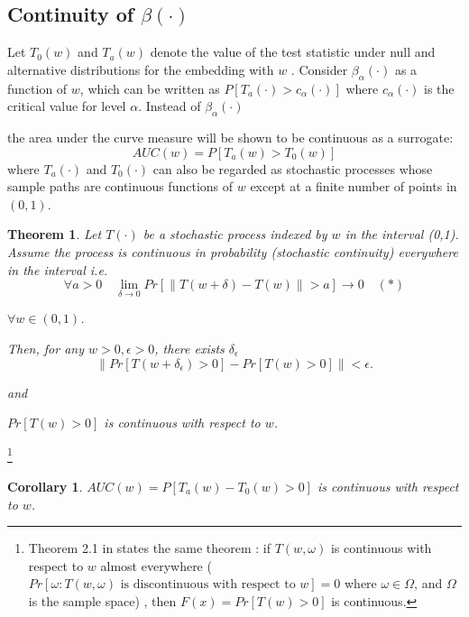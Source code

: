 \documentclass[11pt]{article} %
\newtheorem{thm}{Theorem}
\newtheorem{cor}{Corollary}
\begin{document}
 
\subsection{Continuity of $\beta(\cdot)$} 
 Let $T_0(w)$ and $T_a(w)$ denote the value of the test statistic under null and alternative distributions  for the embedding with $w$ .  %
Consider $\beta_{\alpha}(\cdot)$ as a function of $w$, which can be written as $P\left[T_a(\cdot)>c_{\alpha}(\cdot)\right]$ where $c_{\alpha}(\cdot)$ is the critical value for level $\alpha$. Instead of  $\beta_{\alpha}(\cdot)$

  the area under the curve measure will be shown to be continuous as a surrogate: $$AUC(w)=P\left[T_a(w)>T_0(w)\right]$$ where $T_a(\cdot)$ and $T_0(\cdot)$ can also be regarded as  stochastic processes whose sample paths are continuous functions of $w$ except at a finite number of points in $(0,1)$.


\begin{thm}
Let $T(\cdot)$ be  a stochastic process indexed by $w$ in the interval (0,1). Assume  the process is continuous in probability  (stochastic continuity)   everywhere in the interval  i.e.
$$ \forall a>0 \quad  \lim_{\delta \rightarrow 0} Pr\left[\|T(w+\delta)-T(w) \|>a \right] \rightarrow 0 \quad(*)$$ 

 $\forall w\in (0,1)$.

Then, for any $w>0, \epsilon>0$, there exists $\delta_{\epsilon}$ $$\| Pr\left[T(w+\delta_{\epsilon})>0 \right]- Pr\left[T(w)>0 \right]\|<\epsilon .  $$

and 

$Pr \left[ T(w)>0\right]$ is continuous with respect to $w$.
\end{thm}
\footnote{
Theorem 2.1 in \cite{Norkin1993} states the same theorem :  if $T(w,\omega)$ is continuous with respect to $w$  almost everywhere 
($Pr[\omega:T(w,\omega)\textrm{ is discontinuous with respect to } w]=0$  where $\omega \in \Omega$, and $\Omega$ is the sample space)
, then $F(x)=Pr\left[T(w)>0\right]$ is continuous.}

\begin{cor}{
 $AUC(w)=P\left[T_a(w)-T_0(w) >0 \right]$ is continuous with respect to $w$.}
\end{cor}

\end{document}
